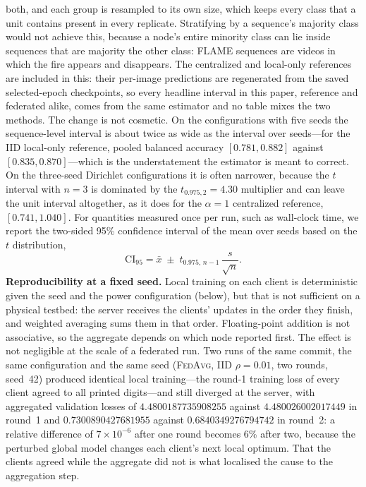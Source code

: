 \documentclass[journal]{IEEEtran}
\newcommand{\fedavg}{\textsc{FedAvg}}
\begin{document}
both, and each group is resampled to its own size, which keeps every class that a unit contains present in every replicate. Stratifying by a sequence's majority class would not achieve this, because a node's entire minority class can lie inside sequences that are majority the other class: FLAME sequences are videos in which the fire appears and disappears. The centralized and local-only references are included in this: their per-image predictions are regenerated from the saved selected-epoch checkpoints, so every headline interval in this paper, reference and federated alike, comes from the same estimator and no table mixes the two methods. The change is not cosmetic. On the configurations with five seeds the sequence-level interval is about twice as wide as the interval over seeds---for the IID local-only reference, pooled balanced accuracy $[0.781, 0.882]$ against $[0.835, 0.870]$---which is the understatement the estimator is meant to correct. On the three-seed Dirichlet configurations it is often narrower, because the $t$ interval with $n=3$ is dominated by the $t_{0.975,2}=4.30$ multiplier and can leave the unit interval altogether, as it does for the $\alpha{=}1$ centralized reference, $[0.741, 1.040]$. For quantities measured once per run, such as wall-clock time, we report the two-sided 95\% confidence interval of the mean over seeds based on the $t$ distribution,
\begin{equation}
\mathrm{CI}_{95} = \bar{x} \;\pm\; t_{0.975,\,n-1}\,\frac{s}{\sqrt{n}} .
\label{eq:ci}
\end{equation}
\textbf{Reproducibility at a fixed seed.} Local training on each client is deterministic given the seed and the power configuration (below), but that is not sufficient on a physical testbed: the server receives the clients' updates in the order they finish, and weighted averaging sums them in that order. Floating-point addition is not associative, so the aggregate depends on which node reported first. The effect is not negligible at the scale of a federated run. Two runs of the same commit, the same configuration and the same seed (\fedavg{}, IID $\rho=0.01$, two rounds, seed~42) produced identical local training---the round-1 training loss of every client agreed to all printed digits---and still diverged at the server, with aggregated validation losses of $4.4800187735908255$ against $4.480026002017449$ in round~1 and $0.7300890427681955$ against $0.6840349276794742$ in round~2: a relative difference of $7\times10^{-6}$ after one round becomes 6\% after two, because the perturbed global model changes each client's next local optimum. That the clients agreed while the aggregate did not is what localised the cause to the aggregation step.
\end{document}
